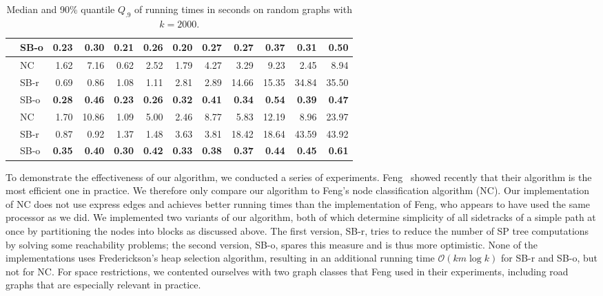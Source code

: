 \documentclass[runningheads,a4paper]{llncs}
\begin{document}
\begin{table}[tb]
\begin{tabularx}{1\textwidth}{p{0.8cm}p{0.8cm}|RR|RR|RR|RR|RR}
& \centering SB-o  & \textbf{0.23} & \textbf{0.30} & \textbf{0.21} & \textbf{0.26} & \textbf{0.20} & \textbf{0.27} & \textbf{0.27} & \textbf{0.37} & \textbf{0.31} & \textbf{0.50} \\
\hline
\centering{} & \centering NC & 1.62 & 7.16 & 0.62 & 2.52 & 1.79 & 4.27 & 3.29 & 9.23 & 2.45 & 8.94 \\
& \centering SB-r  & 0.69 & 0.86 & 1.08 & 1.11 & 2.81 & 2.89 & 14.66 & 15.35 & 34.84 & 35.50 \\
& \centering SB-o  & \textbf{0.28} & \textbf{0.46} & \textbf{0.23} & \textbf{0.26} & \textbf{0.32} & \textbf{0.41} & \textbf{0.34} & \textbf{0.54} & \textbf{0.39} & \textbf{0.47} \\
\hline
\centering{} & \centering NC & 1.70 & 10.86 & 1.09 & 5.00 & 2.46 & 8.77 & 5.83 & 12.19 & 8.96 & 23.97 \\
& \centering SB-r  & 0.87 & 0.92 & 1.37 & 1.48 & 3.63 & 3.81 & 18.42 & 18.64 & 43.59 & 43.92 \\
& \centering SB-o  & \textbf{0.35} & \textbf{0.40} & \textbf{0.30} & \textbf{0.42} & \textbf{0.33} & \textbf{0.38} & \textbf{0.37} & \textbf{0.44} & \textbf{0.45} & \textbf{0.61} \\
\end{tabularx}
\vspace{2mm}
\caption{Median and 90\% quantile $Q_{.9}$ of running times in seconds on random graphs with $k = 2000$.}
\label{table:random}
\end{table}

To demonstrate the effectiveness of our algorithm, we conducted a series of experiments.
Feng~\cite{DBLP:journals/networks/Feng14} showed recently that their algorithm is the most efficient one in practice.
We therefore only compare our algorithm to Feng's node classification algorithm (NC).
Our implementation of NC does not use express edges and achieves better running times than the implementation of Feng, who appears to have used the same processor as we did.
We implemented two variants of our algorithm, both of which determine simplicity of all sidetracks of a simple path at once by partitioning the nodes into blocks as discussed above.
The first version, SB-r, tries to reduce the number of SP tree computations by solving some reachability problems; the second version, SB-o, spares this measure and is thus more optimistic.
None of the implementations uses Frederickson's heap selection algorithm, resulting in an additional running time $\mathcal O(km\log k)$ for SB-r and SB-o, but not for NC.
For space restrictions, we contented ourselves with two graph classes that Feng used in their experiments, including road graphs that are especially relevant in practice.
\end{document}
